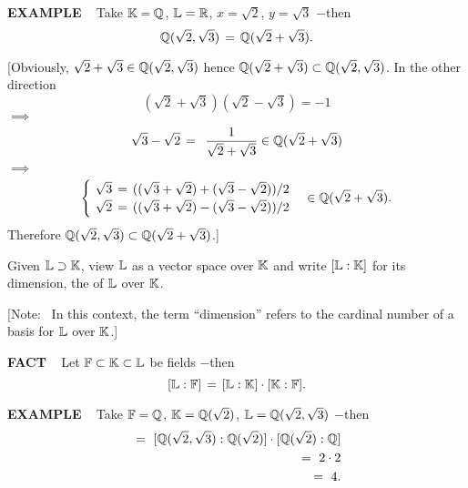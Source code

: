 \begin{x}{\small\bf EXAMPLE} \ %
Take $\mathbb{K} = \mathbb{Q}$, $\mathbb{L} = \mathbb{R}$, $x = \sqrt{2}$, $y = \sqrt{3}$ $-$then
\[
\mathbb{Q}(\sqrt{2},\sqrt{3}) \hspace{0.05cm} = \hspace{0.05cm} \mathbb{Q}(\sqrt{2} + \sqrt{3}).
\]

[Obviously, $\sqrt{2} + \sqrt{3} \in \mathbb{Q}(\sqrt{2},\sqrt{3})$ hence 
$\mathbb{Q}(\sqrt{2} + \sqrt{3}) \subset \mathbb{Q}(\sqrt{2},\sqrt{3})$.  
In the other direction
\[
(\sqrt{2} + \sqrt{3}) (\sqrt{2} - \sqrt{3}) = -1
\]
\qquad\qquad\qquad\qquad $\implies$
\[
\sqrt{3} - \sqrt{2} \hsx = \hsx \ \frac{1}{\sqrt{2} + \sqrt{3}} \in \Q(\sqrt{2} + \sqrt{3})
\]
\qquad\qquad\qquad\qquad $\implies$
\[
\begin{cases}
\ \sqrt{3} \hspace{0.05cm} = \hspace{0.05cm} ((\sqrt{3} + \sqrt{2}) + (\sqrt{3} - \sqrt{2})) / 2\\
\ \sqrt{2} \hspace{0.05cm} = \hspace{0.05cm} ((\sqrt{3} + \sqrt{2}) - (\sqrt{3} - \sqrt{2})) / 2
\end{cases}
\in \mathbb{Q}(\sqrt{2} + \sqrt{3}).
\]
Therefore $\mathbb{Q}(\sqrt{2},\sqrt{3}) \subset \mathbb{Q}(\sqrt{2} + \sqrt{3})$.]
\end{x}

\vspace{0.1cm}

Given $\mathbb{L} \supset \mathbb{K}$, view $\mathbb{L}$ as a vector space over $\mathbb{K}$ and write $[\mathbb{L}:\mathbb{K}]$ for its dimension, the 
of $\mathbb{L}$ over $\mathbb{K}$.

\vspace{0.1cm}

[Note: \ In this context, the term ``dimension'' refers to the cardinal number of a basis for $\mathbb{L}$ over $\mathbb{K}$.]

\vspace{0.2cm}

\begin{x}{\small\bf FACT} \ %
Let $\mathbb{F} \subset \mathbb{K} \subset \mathbb{L}$ be fields $-$then
\[
[\mathbb{L}:\mathbb{F}] \hspace{0.05cm} = \hspace{0.05cm} [\mathbb{L}:\mathbb{K}]  \cdot [\mathbb{K}:\mathbb{F}].  
\]
\end{x}

\vspace{0.1cm}

\begin{x}{\small\bf EXAMPLE} \ %
Take $\mathbb{F} = \mathbb{Q}$, $\mathbb{K} = \mathbb{Q}(\sqrt{2})$, $\mathbb{L} = \mathbb{Q}(\sqrt{2},\sqrt{3})$ $-$then
\begin{align*}
[\Q(\sqrt{2},\sqrt{3}):\Q] \ 
=\ [\Q(\sqrt{2},\sqrt{3}):\Q(\sqrt{2})] \cdot [\Q(\sqrt{2}):\Q]\\
=\ 2 \cdot 2 \\
=\  4.
\end{align*}
\end{x}

